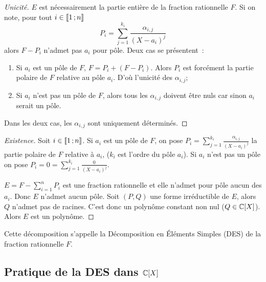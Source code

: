 \begin{proof}[Unicité]
  \(E\) est nécessairement la partie entière de la fraction rationnelle \(F\). Si on note, pour tout \(i \in \mathopen{\llbracket}1\mathclose{}\mathpunct{};n\mathclose{\rrbracket}\)
  \begin{equation}
    P_i = \sum_{j=1}^{k_i} \frac{\alpha_{i,j}}{(X-a_i)^{j}}
  \end{equation}
  alors \(F-P_i\) n'admet pas \(a_i\) pour pôle. Deux cas se présentent~:
  \begin{enumerate}
  \item Si \(a_i\) est un pôle de \(F\), \(F=P_i+(F-P_i)\). Alors \(P_i\) est forcément la partie polaire de \(F\) relative au pôle \(a_i\). D'où l'unicité des \(\alpha_{i,j}\);
  \item Si \(a_i\) n'est pas un pôle de \(F\), alors tous les \(\alpha_{i,j}\) doivent être nuls car sinon \(a_i\) serait un pôle.
  \end{enumerate}
  Dans les deux cas, les \(\alpha_{i,j}\) sont uniquement déterminés.
\end{proof}
\begin{proof}[Existence]
  Soit \(i \in \mathopen{\llbracket}1\mathclose{}\mathpunct{};n\mathclose{\rrbracket}\). Si \(a_i\) est un pôle de \(F\), on pose \(P_i = \sum_{j=1}^{k_i} \frac{\alpha_{i,j}}{(X-a_i)^{j}}\) la partie polaire de \(F\) relative à \(a_i\), (\(k_i\) est l'ordre du pôle \(a_i\)). Si \(a_i\) n'est pas un pôle on pose \(P_i=0=\sum_{j=1}^{k_i} \frac{0}{(X-a_i)^{j}}\).

  \(E=F-\sum_{i=1}^n P_i\) est une fraction rationnelle et elle n'admet pour pôle aucun des \(a_i\). Donc \(E\) n'admet aucun pôle. Soit \((P,Q)\) une forme irréductible de \(E\), alors \(Q\) n'admet pas de racines. C'est donc un polynôme constant non nul (\(Q \in \mathbb{C}[X]\)). Alors \(E\) est un polynôme.
\end{proof}

Cette décomposition s'appelle la Décomposition en Éléments Simples (DES) de la fraction rationnelle \(F\).

\subsection{Pratique de la DES dans \(\mathbb{C}[X]\)}

